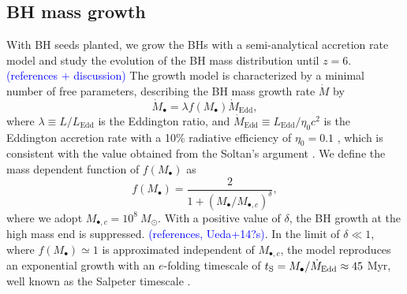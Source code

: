 \documentclass[twocolumn, twocolappendix]{aastex63}
\newcommand{\Msun}{M_\odot}
\newcommand{\Mbh}{M_\bullet}
\newcommand{\Mdot}{\dot{M}}
\newcommand{\blue}[1]{\textcolor{blue}{ #1}}
\begin{document}
\begin{CJK*}{UTF8}{gbsn}
\subsection{BH mass growth}
\label{sec:model}
With BH seeds planted, we grow the BHs with a semi-analytical accretion rate model and study the evolution of the BH mass distribution until $z=6$. 
\blue{(references + discussion)}
The growth model is characterized by a minimal number of free parameters, 
describing the BH mass growth rate $\Mdot$ by
\begin{equation}
  \label{eq:mdot}
  \Mdot_\bullet = \lambda f(\Mbh) \Mdot_\mathrm{Edd} ,
\end{equation}
where $\lambda \equiv L/L_\mathrm{Edd}$ is the Eddington ratio,
and $\Mdot_\mathrm{Edd} \equiv L_{\mathrm{Edd}}/\eta_0 c^2$ is the Eddington accretion rate with a 10\% radiative efficiency of $\eta_0=0.1$ \citep{1973A&A....24..337S},
which is consistent with the value obtained from the Soltan's argument \citep{1982MNRAS.200..115S,2002MNRAS.335..965Y}.
We define the mass dependent function of $f(\Mbh)$ as 
%
\begin{equation}
f(\Mbh) = \frac{2}{1+\left(\Mbh /M_{\bullet,c} \right)^\delta}, 
\end{equation}
%
where we adopt $M_{\bullet,c}=10^8~\Msun$.
With a positive value of $\delta$, the BH growth at the high mass end is suppressed. \blue{(references, Ueda+14?s)}.
In the limit of $\delta \ll 1$, where $f(\Mbh) \simeq 1$ is approximated independent of $M_{\bullet,c}$, the model reproduces an exponential growth with an $e$-folding timescale of
$t_{\rm S} =  \Mbh/\Mdot_{\mathrm{Edd}} \approx 45$ Myr, well known as the Salpeter timescale \citep{1964ApJ...140..796S}.




\end{CJK*}
\end{document}
